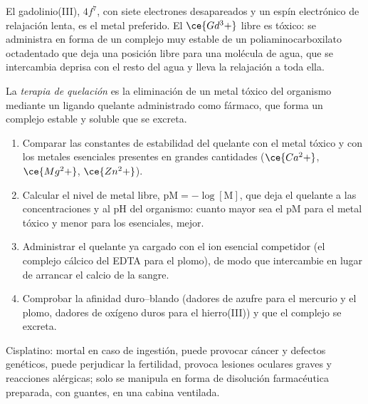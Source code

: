 El gadolinio(III), $4f^7$, con siete electrones desapareados y un espín electrónico de relajación
lenta, es el metal preferido. El $\ce{Gd^3+}$ libre es tóxico: se administra en forma de un
complejo muy estable de un poliaminocarboxilato octadentado que deja una
posición libre para una molécula de agua, que se intercambia deprisa con el resto del agua y lleva la
relajación a toda ella.

\begin{definition}\label{def:b3:bioinorganic:chelation-therapy}
La \emph{terapia de quelación} es la eliminación de un metal
tóxico del organismo mediante un ligando quelante administrado como fármaco, que forma un complejo estable
y soluble que se excreta.
\end{definition}

\begin{method}\label{met:b3:bioinorganic:choose-chelator}
\begin{enumerate}
  \item Comparar las constantes de estabilidad del quelante con el metal tóxico
        y con los metales esenciales presentes en grandes cantidades ($\ce{Ca^2+}$, $\ce{Mg^2+}$,
        $\ce{Zn^2+}$).
  \item Calcular el nivel de metal libre, $\mathrm{pM} = -\log[\mathrm M]$, que deja el quelante a las
        concentraciones y al pH del organismo: cuanto mayor sea el pM para el metal tóxico y
        menor para los esenciales, mejor.
  \item Administrar el quelante ya cargado con el ion esencial competidor (el
        complejo cálcico del EDTA para el plomo), de modo que intercambie en lugar de
        arrancar el calcio de la sangre.
  \item Comprobar la afinidad duro--blando (dadores de azufre para el mercurio y el plomo, dadores
        de oxígeno duros para el hierro(III)) y que el complejo se excreta.
\end{enumerate}
\end{method}

\begin{safety}{}
Cisplatino: mortal en caso de ingestión, puede provocar cáncer y defectos genéticos, puede perjudicar
la fertilidad, provoca lesiones oculares graves y reacciones alérgicas; solo se manipula
en forma de disolución farmacéutica preparada, con guantes, en una cabina ventilada.
\end{safety}


